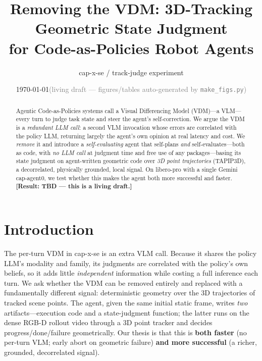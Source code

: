 \documentclass[11pt]{article}
\title{\textbf{Removing the VDM: 3D-Tracking Geometric State Judgment\\
for Code-as-Policies Robot Agents}}
\author{cap-x-se / track-judge experiment}
\date{\today \quad\textcolor{gray}{\small(living draft --- figures/tables auto-generated by \texttt{make\_figs.py})}}
\begin{document}
\maketitle

\begin{abstract}
Agentic Code-as-Policies systems call a Visual Differencing Model (VDM)---a VLM---every turn
to judge task state and steer the agent's self-correction. We argue the VDM is a
\emph{redundant LLM call}: a second VLM invocation whose errors are correlated with the policy
LLM, returning largely the agent's own opinion at real latency and cost. We \emph{remove} it
and introduce a \emph{self-evaluating} agent that self-plans \emph{and} self-evaluates---both
as code, with \emph{no LLM call} at judgment time and free use of any packages---basing its
state judgment on agent-written geometric code over \emph{3D point trajectories} (TAPIP3D), a
decorrelated, physically grounded, local signal. On libero-pro with a single Gemini
cap-agent0, we test whether this makes the agent both more successful and faster.
\textbf{[Result: TBD --- this is a living draft.]}
\end{abstract}

\section{Introduction}
The per-turn VDM in cap-x-se is an extra VLM call. Because it shares the policy LLM's modality
and family, its judgments are correlated with the policy's own beliefs, so it adds little
\emph{independent} information while costing a full inference each turn. We ask whether the VDM
can be removed entirely and replaced with a fundamentally different signal: deterministic
geometry over the 3D trajectories of tracked scene points. The agent, given the same initial
static frame, writes \emph{two} artifacts---execution code and a state-judgment function; the
latter runs on the dense RGB-D rollout video through a 3D point tracker and decides
progress/done/failure geometrically. Our thesis is that this is \textbf{both faster}
(no per-turn VLM; early abort on geometric failure) \textbf{and more successful} (a richer,
grounded, decorrelated signal).
\end{document}
